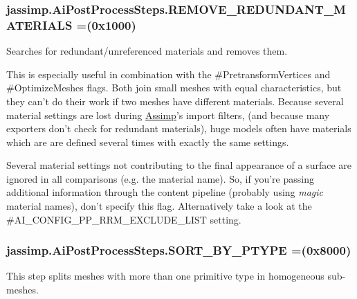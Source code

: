 {{\subsubsection[{R\+E\+M\+O\+V\+E\+\_\+\+R\+E\+D\+U\+N\+D\+A\+N\+T\+\_\+\+M\+A\+T\+E\+R\+I\+A\+L\+S}]{\setlength{\rightskip}{0pt plus 5cm}jassimp.\+Ai\+Post\+Process\+Steps.\+R\+E\+M\+O\+V\+E\+\_\+\+R\+E\+D\+U\+N\+D\+A\+N\+T\+\_\+\+M\+A\+T\+E\+R\+I\+A\+L\+S =(0x1000)}}\label{enumjassimp_1_1_ai_post_process_steps_a7de1d3d57df60b08b9484e6055c1b309}
Searches for redundant/unreferenced materials and removes them.

This is especially useful in combination with the \#\+Pretransform\+Vertices and \#\+Optimize\+Meshes flags. Both join small meshes with equal characteristics, but they can't do their work if two meshes have different materials. Because several material settings are lost during \hyperlink{class_assimp}{Assimp}'s import filters, (and because many exporters don't check for redundant materials), huge models often have materials which are are defined several times with exactly the same settings.

Several material settings not contributing to the final appearance of a surface are ignored in all comparisons (e.\+g. the material name). So, if you're passing additional information through the content pipeline (probably using {\itshape magic} material names), don't specify this flag. Alternatively take a look at the {\ttfamily \#\+A\+I\+\_\+\+C\+O\+N\+F\+I\+G\+\_\+\+P\+P\+\_\+\+R\+R\+M\+\_\+\+E\+X\+C\+L\+U\+D\+E\+\_\+\+L\+I\+S\+T} setting. \hypertarget{enumjassimp_1_1_ai_post_process_steps_a90814c095595a8cb812895e1cc2d97a6}{
\subsubsection[{S\+O\+R\+T\+\_\+\+B\+Y\+\_\+\+P\+T\+Y\+P\+E}]{\setlength{\rightskip}{0pt plus 5cm}jassimp.\+Ai\+Post\+Process\+Steps.\+S\+O\+R\+T\+\_\+\+B\+Y\+\_\+\+P\+T\+Y\+P\+E =(0x8000)}}\label{enumjassimp_1_1_ai_post_process_steps_a90814c095595a8cb812895e1cc2d97a6}
This step splits meshes with more than one primitive type in homogeneous sub-\/meshes.

}
